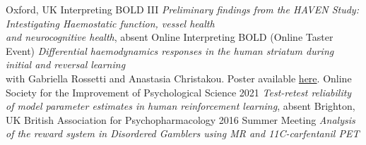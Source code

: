 {Oxford, UK}
{Interpreting BOLD III}
{\emph{Preliminary findings from the HAVEN Study: Intestigating Haemostatic function, vessel health\\
and neurocognitive health}, \footnotesize absent}
\vspace{0.5em}
{Online}
{Interpreting BOLD (Online Taster Event)}
{\emph{Differential haemodynamics responses in the human striatum during initial and reversal learning}\\
\footnotesize with Gabriella Rossetti and Anastasia Christakou. Poster available \href{https://github.com/sohaamir/misc_materials/tree/main/posters}{here}.}
\vspace{0.5em}
\datedsubsectionnarrow{}
{Online}
{Society for the Improvement of Psychological Science 2021}
{\emph{Test-retest reliability of model parameter estimates in human reinforcement learning}, \footnotesize absent}
\vspace{0.5em}
{Brighton, UK}
{British Association for Psychopharmacology 2016 Summer Meeting}
{\emph{Analysis of the reward system in Disordered Gamblers using MR and 11C-carfentanil PET}}
